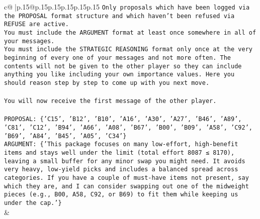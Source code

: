 \documentclass{article}
\begin{document}
{\begin{supertabular}{c@{$\;$}|p{.15\linewidth}@{}p{.15\linewidth}p{.15\linewidth}p{.15\linewidth}p{.15\linewidth}p{.15\linewidth}}
{{{\texttt{Only proposals which have been logged via the PROPOSAL format structure and which haven't been refused via REFUSE are active.} \\
\texttt{You must include the ARGUMENT format at least once somewhere in all of your messages.} \\
\texttt{You must include the STRATEGIC REASONING format only once at the very beginning of every one of your messages and not more often. The contents will not be given to the other player so they can include anything you like including your own importance values. Here you should reason step by step to come up with you next move.} \\
\\ 
\texttt{You will now receive the first message of the other player.} \\
\\ 
\texttt{PROPOSAL: \{'C15', 'B12', 'B10', 'A16', 'A30', 'A27', 'B46', 'A89', 'C81', 'C12', 'B94', 'A66', 'A08', 'B67', 'B00', 'B09', 'A58', 'C92', 'B69', 'A84', 'B45', 'A05', 'C34'\}} \\
\texttt{ARGUMENT: \{'This package focuses on many low{-}effort, high{-}benefit items and stays well under the limit (total effort 8087 ≤ 8170), leaving a small buffer for any minor swap you might need. It avoids very heavy, low{-}yield picks and includes a balanced spread across categories. If you have a couple of must{-}have items not present, say which they are, and I can consider swapping out one of the midweight pieces (e.g., B00, A58, C92, or B69) to fit them while keeping us under the cap.'\}} \\
            }
        }
    }
    & \\ \\


\end{supertabular}}
\end{document}
